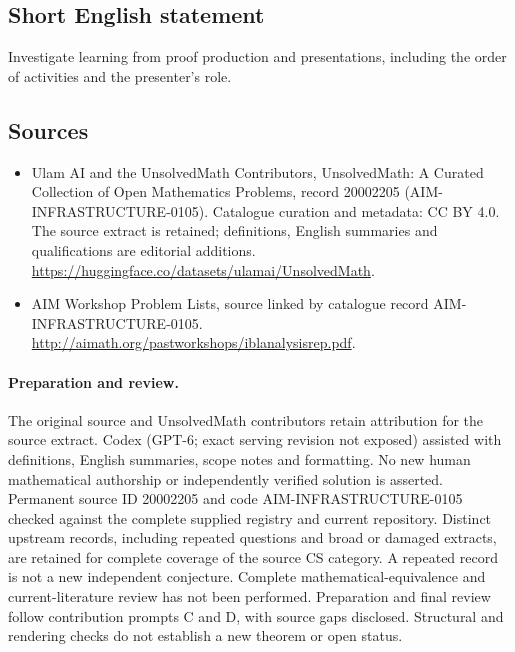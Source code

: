 \documentclass[11pt]{article}
\begin{document}
\subsection{Short English statement}
Investigate learning from proof production and presentations, including the order of activities and the presenter's role.
\subsection{Sources}
\begin{itemize}
\item[\hypertarget{source:20002205:1}{S1}] Ulam AI and the UnsolvedMath Contributors, UnsolvedMath: A Curated Collection of Open Mathematics Problems, record 20002205 (AIM-INFRASTRUCTURE-0105). Catalogue curation and metadata: CC BY 4.0. The source extract is retained; definitions, English summaries and qualifications are editorial additions.
\url{https://huggingface.co/datasets/ulamai/UnsolvedMath}.
\item[\hypertarget{source:20002205:2}{S2}] AIM Workshop Problem Lists, source linked by catalogue record AIM-INFRASTRUCTURE-0105.
\url{http://aimath.org/pastworkshops/iblanalysisrep.pdf}.
\end{itemize}
\paragraph{Preparation and review.}
The original source and UnsolvedMath contributors retain attribution for the source extract. Codex (GPT-6; exact serving revision not exposed) assisted with definitions, English summaries, scope notes and formatting. No new human mathematical authorship or independently verified solution is asserted. Permanent source ID 20002205 and code AIM-INFRASTRUCTURE-0105 checked against the complete supplied registry and current repository. Distinct upstream records, including repeated questions and broad or damaged extracts, are retained for complete coverage of the source CS category. A repeated record is not a new independent conjecture. Complete mathematical-equivalence and current-literature review has not been performed. Preparation and final review follow contribution prompts C and D, with source gaps disclosed. Structural and rendering checks do not establish a new theorem or open status.
\label{end:20002205}
\end{document}
